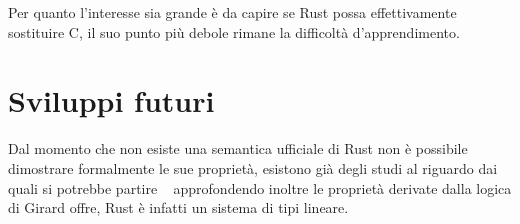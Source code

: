 \documentclass[Lau,binding=0.6cm]{sapthesis}
\begin{document}
Per quanto l'interesse sia grande è da capire se Rust possa effettivamente sostituire C, il suo punto più debole rimane la difficoltà d'apprendimento.

\section{Sviluppi futuri} 
Dal momento che non esiste una semantica ufficiale di Rust non è possibile dimostrare formalmente le sue proprietà, esistono già degli studi al riguardo dai quali si potrebbe partire ~\cite{krust} approfondendo inoltre le proprietà derivate dalla logica di Girard offre, Rust è infatti un sistema di tipi lineare. 



\backmatter

\cleardoublepage
{}

{}
\end{document}
